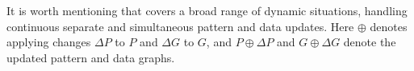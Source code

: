 It is worth mentioning that \dynteamF{} covers a broad range of dynamic situations,
\ie handling continuous separate and simultaneous pattern and data updates.
Here $\oplus$ denotes applying changes $\Delta P$ to $P$ and $\Delta G$ to $G$, and
 $P\oplus\Delta P$ and $G\oplus\Delta G$ denote the updated pattern and data graphs.





